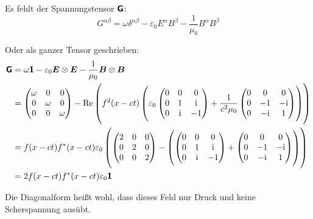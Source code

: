 Es fehlt der Spannungstensor $\boldsymbol{\mathsf{G}}$:
\[
	G^{\alpha\beta} = \omega \delta^{\alpha\beta} - \varepsilon_0 E^\alpha B^\beta - \frac{1}{\mu_0} B^\alpha B^\beta
\]

Oder als ganzer Tensor geschrieben:
\begin{align*}
	\tens G &= \omega \tens 1 - \varepsilon_0 \vec E \otimes \vec E - \frac{1}{\mu_0} \vec B \otimes \vec B \\
	&=
	\begin{pmatrix}
		\omega & 0 & 0 \\
				0 & \omega & 0 \\
		  0 & 0 & \omega
	\end{pmatrix}
	-
	\re\del{
		f^2(x-ct)
		\del{
			\varepsilon_0
			\begin{pmatrix}
				0 & 0 & 0 \\
		  0 & 1 & \ii \\
		  0 & \ii & -1
			\end{pmatrix}
			+
			\frac{1}{c^2 \mu_0}
			\begin{pmatrix}
				0 & 0 & 0 \\
		  0 & -1 & -\ii \\
		  0 & -\ii & 1
			\end{pmatrix}
		}
	} \\
	&=
	f(x-ct)f^*(x-ct) \varepsilon_0 \del{
		\begin{pmatrix}
			2 & 0 & 0 \\
			0 & 2 & 0 \\
			0 & 0 & 2
		\end{pmatrix}
		-
		\del{
			\begin{pmatrix}
				0 & 0 & 0 \\
		  0 & 1 & \ii \\
		  0 & \ii & -1
			\end{pmatrix}
			+
			\begin{pmatrix}
				0 & 0 & 0 \\
		  0 & -1 & -\ii \\
		  0 & -\ii & 1
			\end{pmatrix}
		}
	} \\
	&= 2 f(x-ct)f^*(x-ct) \varepsilon_0 \tens 1
\end{align*}

Die Diagonalform heißt wohl, dass dieses Feld nur Druck und keine Scherspannung
ausübt.


